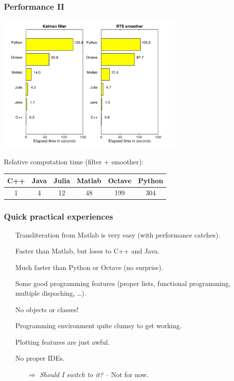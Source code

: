 \documentclass[xcolor=svgnames,english,presentation]{beamer}
\begin{document}
\begin{frame}
  \frametitle{Performance II}
  \centering
  \includegraphics[width=0.7\textwidth]{kf-benchmark/times}

  \alert{Relative computation time (filter + smoother):}

  \begin{tabular}{|c|c|c|c|c|c|}
  \hline
  {\bf C++}     & {\bf Java}    & {\bf Julia}   & {\bf Matlab}  & {\bf Octave}  & {\bf Python}  \\ 
  \hline
1       & 4       & 12      & 48      & 199     & 304 \\
\hline
  \end{tabular}
\end{frame}

\begin{frame}
  \frametitle{Quick practical experiences}

  \begin{itemize}[<+->]
  \item[\textcolor{green}\checkmark] \alert{Transliteration from Matlab} is very easy (with performance catches).
  \item[\textcolor{green}\checkmark] Faster than \alert{Matlab}, but loses to \alert{C++ and Java}.
  \item[\textcolor{green}\checkmark] Much faster than \alert{Python or Octave} (no surprise).
  \item[\textcolor{green}\checkmark] Some \alert{good programming features} (proper lists, functional programming, multiple dispaching, \ldots).
  \item[\textcolor{red}\checkmark] \alert{No objects or classes!}
  \item[\textcolor{red}\checkmark] Programming environment quite \alert{clumsy to get working}.
  \item[\textcolor{red}\checkmark] \alert{Plotting features} are just awful.
  \item[\textcolor{red}\checkmark] No proper \alert{IDEs}.
  \begin{itemize}[<+->]       
  \item[$\Rightarrow$] {\it Should I switch to it?} -- \alert{Not for now.}
  \end{itemize}
  \end{itemize}

\end{frame}
\end{document}
